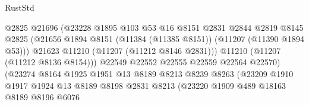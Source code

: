 \begin{lexlean}{RustStd}
\begin{coremodule}
                                        @2825
                                        @21696
                                        (@23228
                                          @1895
                                          @103
                                          @53
                                          @16
                                          @8151
                                          @2831
                                          @2844
                                          @2819
                                          @8145
                                          @2825
                                          (@21656
                                            @1894
                                            @8151
                                            (@11384 (@11385 @8151))
                                            (@11207 (@11390 @1894 @53)))
                                          @21623
                                          @11210
                                          (@11207 (@11212 @8146 @2831)))
                                        @11210
                                        (@11207 (@11212 @8136 @8154)))
                                      @22549
                                      @22552
                                      @22555
                                      @22559
                                      @22564
                                      @22570)
                                    (@23274
                                      @8164
                                      @1925
                                      @1951
                                      @13
                                      @8189
                                      @8213
                                      @8239
                                      @8263
                                      (@23209
                                        @1910
                                        @1917
                                        @1924
                                        @13
                                        @8189
                                        @8198
                                        @2831
                                        @8213
                                        (@23220
                                          @1909
                                          @489
                                          @18163
                                          @8189
                                          @8196
                                          @6076

\end{coremodule}
\end{lexlean}
